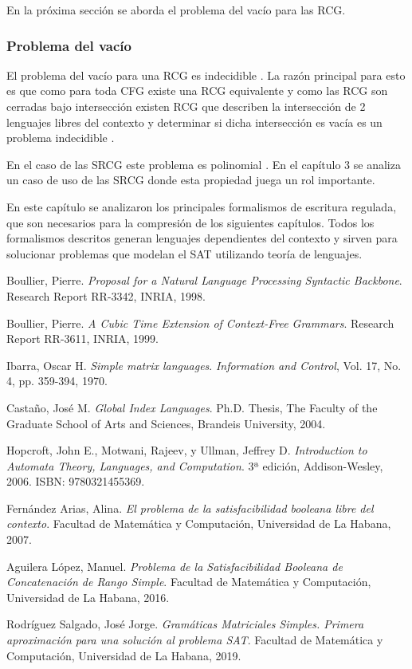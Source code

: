 \documentclass[12pt]{article}
\begin{document}
En la próxima sección se aborda el problema del vacío para las RCG.
\subsubsection{Problema del vacío}

El problema del vacío para una RCG es indecidible \cite{propertiesRCGBib}.
La razón principal para esto es que como para toda CFG existe una RCG equivalente y como las RCG son cerradas
bajo intersección existen RCG que describen la intersección de 2 lenguajes libres del contexto y determinar
si dicha intersección es vacía es un problema indecidible \cite{propertiesRCGBib}.

En el caso de las SRCG este problema es polinomial \cite{mainRCGBib}. En el capítulo 3 se analiza un caso de uso de las
SRCG donde esta propiedad juega un rol importante.

En este capítulo se analizaron los principales formalismos de escritura regulada, que son necesarios para la compresión de
los siguientes capítulos. Todos los formalismos descritos generan lenguajes dependientes del contexto y sirven para
solucionar problemas que modelan el SAT utilizando teoría de lenguajes.

\begin{thebibliography}{99}

    Boullier, Pierre.
    \textit{Proposal for a Natural Language Processing Syntactic Backbone}.
    Research Report RR-3342, INRIA, 1998.

    Boullier, Pierre.
    \textit{A Cubic Time Extension of Context-Free Grammars}.
    Research Report RR-3611, INRIA, 1999.

    Ibarra, Oscar H.
    \textit{Simple matrix languages}.
    \textit{Information and Control}, Vol. 17, No. 4, pp. 359-394, 1970.

    Castaño, José M.
    \textit{Global Index Languages}.
    Ph.D. Thesis, The Faculty of the Graduate School of Arts and Sciences, Brandeis University, 2004.

    Hopcroft, John E., Motwani, Rajeev, y Ullman, Jeffrey D.
    \textit{Introduction to Automata Theory, Languages, and Computation}.
    3ª edición, Addison-Wesley, 2006. ISBN: 9780321455369.

    Fernández Arias, Alina.
    \textit{El problema de la satisfacibilidad booleana libre del contexto}.
    Facultad de Matemática y Computación, Universidad de La Habana, 2007.

    Aguilera López, Manuel.
    \textit{Problema de la Satisfacibilidad Booleana de Concatenación de Rango Simple}.
    Facultad de Matemática y Computación, Universidad de La Habana, 2016.

    Rodríguez Salgado, José Jorge.
    \textit{Gramáticas Matriciales Simples. Primera aproximación para una solución al problema SAT}.
    Facultad de Matemática y Computación, Universidad de La Habana, 2019.

\end{thebibliography}
\end{document}
